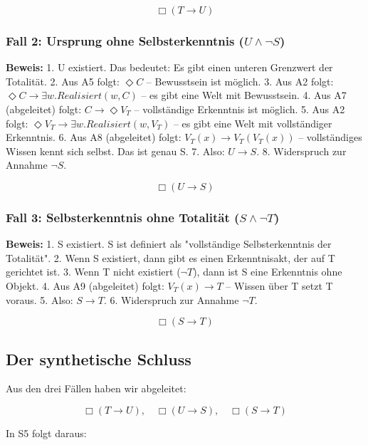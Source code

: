 \documentclass[
]{article}
\begin{document}
\[
\boxed{\Box(T \rightarrow U)}
\]

\subsubsection{Fall 2: Ursprung ohne Selbsterkenntnis (\(U \land \neg S\))}\label{fall-2-ursprung-ohne-selbsterkenntnis-u-land-neg-s}

\textbf{Beweis:}
1. U existiert. Das bedeutet: Es gibt einen unteren Grenzwert der Totalität.
2. Aus A5 folgt: \(\Diamond C\) – Bewusstsein ist möglich.
3. Aus A2 folgt: \(\Diamond C \rightarrow \exists w. Realisiert(w,C)\) – es gibt eine Welt mit Bewusstsein.
4. Aus A7 (abgeleitet) folgt: \(C \rightarrow \Diamond V_T\) – vollständige Erkenntnis ist möglich.
5. Aus A2 folgt: \(\Diamond V_T \rightarrow \exists w. Realisiert(w,V_T)\) – es gibt eine Welt mit vollständiger Erkenntnis.
6. Aus A8 (abgeleitet) folgt: \(V_T(x) \rightarrow V_T(V_T(x))\) – vollständiges Wissen kennt sich selbst. Das ist genau S.
7. Also: \(U \rightarrow S\).
8. Widerspruch zur Annahme \(\neg S\).

\[
\boxed{\Box(U \rightarrow S)}
\]

\subsubsection{Fall 3: Selbsterkenntnis ohne Totalität (\(S \land \neg T\))}\label{fall-3-selbsterkenntnis-ohne-totalituxe4t-s-land-neg-t}

\textbf{Beweis:}
1. S existiert. S ist definiert als "vollständige Selbsterkenntnis der Totalität".
2. Wenn S existiert, dann gibt es einen Erkenntnisakt, der auf T gerichtet ist.
3. Wenn T nicht existiert (\(\neg T\)), dann ist S eine Erkenntnis ohne Objekt.
4. Aus A9 (abgeleitet) folgt: \(V_T(x) \rightarrow T\) – Wissen über T setzt T voraus.
5. Also: \(S \rightarrow T\).
6. Widerspruch zur Annahme \(\neg T\).

\[
\boxed{\Box(S \rightarrow T)}
\]

\subsection{Der synthetische Schluss}\label{der-synthetische-schluss}

Aus den drei Fällen haben wir abgeleitet:

\[
\Box(T \rightarrow U), \quad \Box(U \rightarrow S), \quad \Box(S \rightarrow T)
\]

In S5 folgt daraus:
\end{document}

